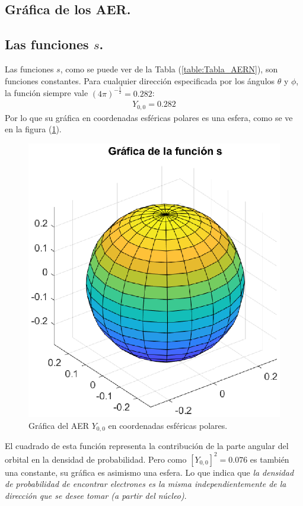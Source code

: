 \subsection{Gráfica de los AER.}

\subsection*{Las funciones \texorpdfstring{$s$}{s}.}

Las funciones $s$, como se puede ver de la Tabla (\ref{table:Tabla_AERN}), son funciones constantes. Para cualquier dirección especificada por los ángulos $\theta$ y $\phi$, la función siempre vale $(4 \pi)^{-\frac{1}{2}} = 0.282$:
\begin{align*}
Y_{0, 0} = 0.282
\end{align*}
Por lo que su gráfica en coordenadas esféricas polares es una esfera, como se ve en la figura (\ref{fig:figura_plot_Y00}).
\begin{figure}[H]
    \centering
    \includegraphics[scale=1]{Imagenes/Plot_Y00_Esfera.eps}
    \caption{Gráfica del AER $Y_{0,0}$ en coordenadas esféricas polares.}
    \label{fig:figura_plot_Y00}
\end{figure}
El cuadrado de esta función representa la contribución de la parte angular del orbital en la densidad de probabilidad. Pero como $[Y_{0,0}]^{2} = 0.076$ es también una constante, su gráfica es asimismo una esfera. Lo que indica que \emph{la densidad de probabilidad de encontrar electrones es la misma independientemente de la dirección que se desee tomar (a partir del núcleo)}.

